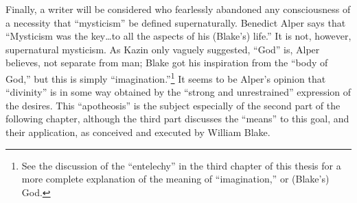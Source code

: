 Finally, a writer will be considered who fearlessly abandoned any consciousness of a necessity
that \enquote{mysticism} be defined supernaturally. Benedict Alper says that
\enquote{Mysticism was the key\dots to all the aspects of his (Blake's) life.}\supercite{alper:blake-mysticism}
It is not, however, supernatural mysticism.\supercite{alper:blake-mysticism}
As Kazin only vaguely suggested, \enquote{God} is, Alper believes, not separate from man; Blake got his
inspiration from the \enquote{body of God,} but this is simply \enquote{imagination.}\supercite{alper:blake-mysticism}\footnote{See the discussion of the \enquote{entelechy} in the third chapter of this thesis for a more complete explanation of the meaning of \enquote{imagination,} or (Blake's) God.}
It seems to be Alper's opinion that \enquote{divinity} is in some way obtained by the \enquote{strong and
unrestrained} expression of the desires. This \enquote{apotheosis} is the subject especially of the
second part of the following chapter, although the third part discusses the \enquote{means}
to this goal, and their application, as conceived and executed by William Blake.